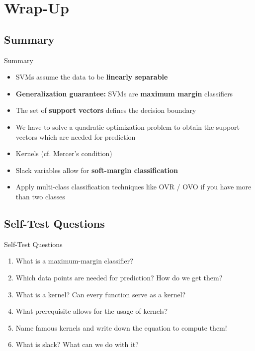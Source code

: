 \section{Wrap-Up}

\subsection{Summary}

\begin{frame}{Summary}{}
	\begin{itemize}
		\item SVMs  assume the data to be \textbf{linearly separable}
		\item \textbf{Generalization guarantee:} SVMs are \textbf{maximum margin} classifiers
		\item The set of \textbf{support vectors} defines the decision boundary
		\item We have to solve a quadratic optimization problem to obtain the support vectors which are needed for prediction
		\item {} Kernels (cf. Mercer's condition)
		\item Slack variables allow for \textbf{soft-margin classification}
		\item Apply multi-class classification techniques like OVR / OVO if you have more than two classes
	\end{itemize}
\end{frame}


\subsection{Self-Test Questions}

\begin{frame}{Self-Test Questions}{}\important
	\begin{enumerate}
		\item What is a maximum-margin classifier?
		\item Which data points are needed for prediction? How do we get them?
		\item What is a kernel? Can every function serve as a kernel?
		\item What prerequisite allows for the usage of kernels?
		\item Name famous kernels and write down the equation to compute them!
		\item What is slack? What can we do with it?
	\end{enumerate}
\end{frame}


